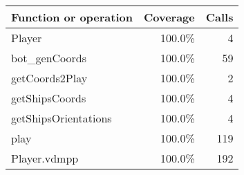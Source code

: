 \bigskip
\begin{longtable}{|l|r|r|}
\hline
Function or operation & Coverage & Calls \\
\hline
\hline
Player & 100.0\% & 4 \\
\hline
bot\_genCoords & 100.0\% & 59 \\
\hline
getCoords2Play & 100.0\% & 2 \\
\hline
getShipsCoords & 100.0\% & 4 \\
\hline
getShipsOrientations & 100.0\% & 4 \\
\hline
play & 100.0\% & 119 \\
\hline
\hline
Player.vdmpp & 100.0\% & 192 \\
\hline
\end{longtable}

